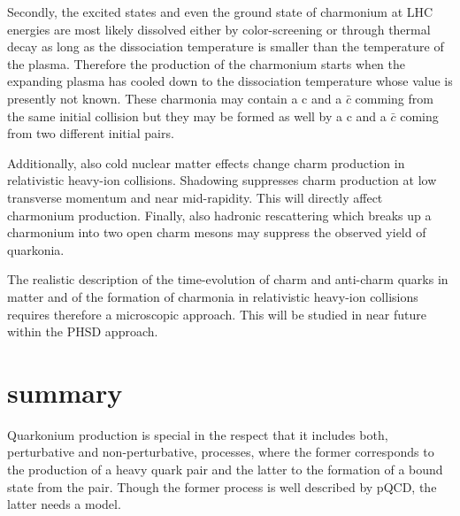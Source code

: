 \documentclass[twocolumn,aps,superscriptaddress,showpacs,nofootinbib,floatfix]{revtex4}
\begin{document}
Secondly, the excited states and even the ground state of charmonium at LHC energies are most likely dissolved either by color-screening or through thermal decay as long as the dissociation temperature is smaller than the temperature of the plasma.
Therefore the production of the charmonium starts when the expanding plasma has cooled down to the dissociation temperature whose value is presently not known. These charmonia may contain a c and a $\bar c$ comming from the same initial collision but they may be formed as well by a c and a $\bar c$ coming from two different initial pairs.

Additionally, also cold nuclear matter effects change charm production in relativistic heavy-ion collisions. Shadowing suppresses charm production at low transverse momentum and near mid-rapidity. This will directly affect charmonium production. Finally, also hadronic rescattering which breaks up a charmonium into two open charm mesons may suppress the observed yield of quarkonia.



The realistic description of the  time-evolution of charm and anti-charm quarks in matter and of the formation of charmonia in relativistic heavy-ion collisions requires therefore a microscopic approach. This will be studied in near future within the PHSD approach.

\section{summary}\label{summary}

Quarkonium production is special in the respect that it includes both, perturbative and non-perturbative, processes, where the former corresponds to the production of a heavy quark pair and the latter to the formation of a bound state from the pair.
Though the former process is well described by pQCD, the latter needs a model.
\end{document}
